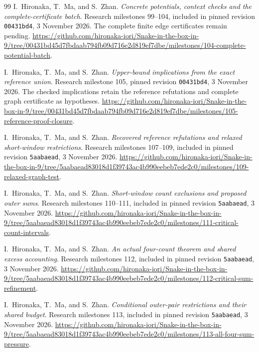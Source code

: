 \documentclass[11pt,a4paper]{article}
\theoremstyle{definition}
\theoremstyle{remark}
\begin{document}
\begin{thebibliography}{99}
I.~Hironaka, T.~Ma, and S.~Zhan. \emph{Concrete potentials, context checks and the complete-certificate batch}. Research milestones 99--104, included in pinned revision \texttt{00431bd4}, 3 November 2026. The complete finite edge certificates remain pending.
\url{https://github.com/hironaka-iori/Snake-in-the-box-in-9/tree/00431bd45d7fbdaab794fb09d716e2d819ef7dbe/milestones/104-complete-potential-batch}.

I.~Hironaka, T.~Ma, and S.~Zhan. \emph{Upper-bound implications from the exact reference union}. Research milestone 105, pinned revision \texttt{00431bd4}, 3 November 2026. The checked implications retain the reference refutations and complete graph certificate as hypotheses.
\url{https://github.com/hironaka-iori/Snake-in-the-box-in-9/tree/00431bd45d7fbdaab794fb09d716e2d819ef7dbe/milestones/105-reference-proof-closure}.

I.~Hironaka, T.~Ma, and S.~Zhan. \emph{Recovered reference refutations and relaxed short-window restrictions}. Research milestones 107--109, included in pinned revision \texttt{5aabaead}, 3 November 2026.
\url{https://github.com/hironaka-iori/Snake-in-the-box-in-9/tree/5aabaead83018d1f39743ac4b990eebeb7ede2c0/milestones/109-relaxed-graph-test}.

I.~Hironaka, T.~Ma, and S.~Zhan. \emph{Short-window count exclusions and proposed outer sums}. Research milestones 110--111, included in pinned revision \texttt{5aabaead}, 3 November 2026.
\url{https://github.com/hironaka-iori/Snake-in-the-box-in-9/tree/5aabaead83018d1f39743ac4b990eebeb7ede2c0/milestones/111-critical-count-intervals}.

I.~Hironaka, T.~Ma, and S.~Zhan. \emph{An actual four-count theorem and shared excess accounting}. Research milestones 112, included in pinned revision \texttt{5aabaead}, 3 November 2026.
\url{https://github.com/hironaka-iori/Snake-in-the-box-in-9/tree/5aabaead83018d1f39743ac4b990eebeb7ede2c0/milestones/112-critical-sum-refinement}.

I.~Hironaka, T.~Ma, and S.~Zhan. \emph{Conditional outer-pair restrictions and their shared budget}. Research milestones 113, included in pinned revision \texttt{5aabaead}, 3 November 2026.
\url{https://github.com/hironaka-iori/Snake-in-the-box-in-9/tree/5aabaead83018d1f39743ac4b990eebeb7ede2c0/milestones/113-all-four-sum-pressure}.


\end{thebibliography}
\end{document}

